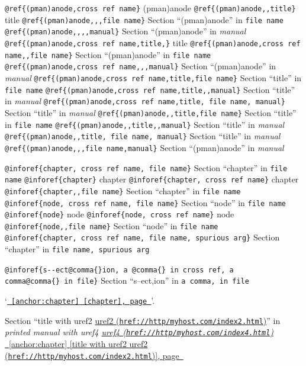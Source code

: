 \documentclass{book}
\renewcommand{\_}{\Texinfounderscore\discretionary{}{}{}}
\begin{document}
\begin{titlepage}
{\texttt{@ref\{(pman)anode,cross ref name\}} (pman)anode
\texttt{@ref\{(pman)anode{,}{,}title\}} title
\texttt{@ref\{(pman)anode{,}{,},file name\}} Section ``(pman)anode'' in \texttt{file name}
\texttt{@ref\{(pman)anode{,}{,}{,}{,}manual\}} Section ``(pman)anode'' in \textsl{manual}
\texttt{@ref\{(pman)anode,cross ref name,title,\}} title
\texttt{@ref\{(pman)anode,cross ref name{,}{,}file name\}} Section ``(pman)anode'' in \texttt{file name}
\texttt{@ref\{(pman)anode,cross ref name{,}{,},manual\}} Section ``(pman)anode'' in \textsl{manual}
\texttt{@ref\{(pman)anode,cross ref name,title,file name\}} Section ``title'' in \texttt{file name}
\texttt{@ref\{(pman)anode,cross ref name,title{,}{,}manual\}} Section ``title'' in \textsl{manual}
\texttt{@ref\{(pman)anode,cross ref name,title,\ file name,\ manual\}} Section ``title'' in \textsl{manual}
\texttt{@ref\{(pman)anode{,}{,}title,file name\}} Section ``title'' in \texttt{file name}
\texttt{@ref\{(pman)anode{,}{,}title{,}{,}manual\}} Section ``title'' in \textsl{manual}
\texttt{@ref\{(pman)anode{,}{,}title,\ file name,\ manual\}} Section ``title'' in \textsl{manual}
\texttt{@ref\{(pman)anode{,}{,},file name,manual\}} Section ``(pman)anode'' in \textsl{manual}


\texttt{@inforef\{chapter,\ cross ref name,\ file name\}} Section ``chapter'' in \texttt{file name}
\texttt{@inforef\{chapter\}} chapter
\texttt{@inforef\{chapter,\ cross ref name\}} chapter
\texttt{@inforef\{chapter{,}{,}file name\}} Section ``chapter'' in \texttt{file name}
\texttt{@inforef\{node,\ cross ref name,\ file name\}} Section ``node'' in \texttt{file name}
\texttt{@inforef\{node\}} node
\texttt{@inforef\{node,\ cross ref name\}} node
\texttt{@inforef\{node{,}{,}file name\}} Section ``node'' in \texttt{file name}
\texttt{@inforef\{chapter,\ cross ref name,\ file name,\ spurious arg\}} Section ``chapter'' in \texttt{file name,\ spurious arg}

\texttt{@inforef\{s{-}{-}ect@comma\{\}ion,\ a @comma\{\}\ in cross
ref,\ a comma@comma\{\}\ in file\}}
Section ``s--ect,ion'' in \texttt{a comma,\ in file}

`\texttt{\hyperref[anchor:chapter]{\chaptername~\ref*{anchor:chapter} [chapter], page~\pageref*{anchor:chapter}}}'.

Section ``title with uref2 \href{href://http/myhost.com/index2.html}{uref2 (\nolinkurl{href://http/myhost.com/index2.html})}'' in \textsl{printed manual with uref4 \href{href://http/myhost.com/index4.html}{uref4 (\nolinkurl{href://http/myhost.com/index4.html})}}
\hyperref[anchor:chapter]{\chaptername~\ref*{anchor:chapter} [title with uref2 \href{href://http/myhost.com/index2.html}{uref2 (\nolinkurl{href://http/myhost.com/index2.html})}], page~\pageref*{anchor:chapter}}

}
\end{titlepage}
\end{document}
